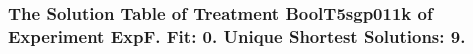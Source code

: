 \begin{frame}
 \fontsize{8pt}{9pt}\selectfont
 \frametitle{ The Solution Table of Treatment BoolT5sgp011k of Experiment ExpF. Fit: 0. Unique Shortest Solutions: 9. }

 \label{ExpFSolutionTable009.tex}  
 \end{frame}

